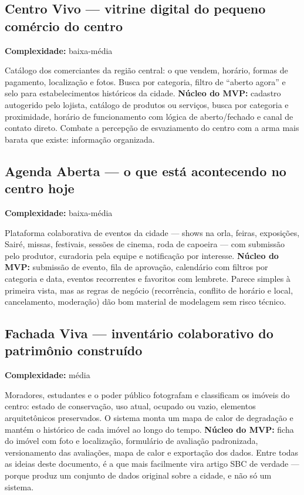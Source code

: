 \documentclass[11pt,a4paper]{article}
\newcommand{\complex}[1]{{\small\color{cinza}\textbf{Complexidade:} #1}}
\begin{document}
\subsection{Centro Vivo --- vitrine digital do pequeno comércio do centro}
\complex{baixa-média}

Catálogo dos comerciantes da região central: o que vendem, horário, formas de pagamento,
localização e fotos. Busca por categoria, filtro de ``aberto agora'' e selo para
estabelecimentos históricos da cidade. \textbf{Núcleo do MVP:} cadastro autogerido pelo lojista,
catálogo de produtos ou serviços, busca por categoria e proximidade, horário de funcionamento com
lógica de aberto/fechado e canal de contato direto. Combate a percepção de esvaziamento do centro
com a arma mais barata que existe: informação organizada.

\subsection{Agenda Aberta --- o que está acontecendo no centro hoje}
\complex{baixa-média}

Plataforma colaborativa de eventos da cidade --- shows na orla, feiras, exposições, Sairé, missas,
festivais, sessões de cinema, roda de capoeira --- com submissão pelo produtor, curadoria pela
equipe e notificação por interesse. \textbf{Núcleo do MVP:} submissão de evento, fila de aprovação,
calendário com filtros por categoria e data, eventos recorrentes e favoritos com lembrete. Parece
simples à primeira vista, mas as regras de negócio (recorrência, conflito de horário e local,
cancelamento, moderação) dão bom material de modelagem sem risco técnico.

\subsection{Fachada Viva --- inventário colaborativo do patrimônio construído}
\complex{média}

Moradores, estudantes e o poder público fotografam e classificam os imóveis do centro: estado de
conservação, uso atual, ocupado ou vazio, elementos arquitetônicos preservados. O sistema monta um
mapa de calor de degradação e mantém o histórico de cada imóvel ao longo do tempo. \textbf{Núcleo
do MVP:} ficha do imóvel com foto e localização, formulário de avaliação padronizada, versionamento
das avaliações, mapa de calor e exportação dos dados. Entre todas as ideias deste documento, é a que
mais facilmente vira artigo SBC de verdade --- porque produz um conjunto de dados original sobre a
cidade, e não só um sistema.
\end{document}
